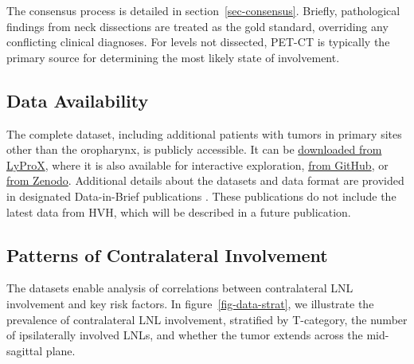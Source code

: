\documentclass[
  sn-mathphys-num,
]{sn-jnl}
\begin{document}
The consensus process is detailed in section~\ref{sec-consensus}.
Briefly, pathological findings from neck dissections are treated as the
gold standard, overriding any conflicting clinical diagnoses. For levels
not dissected, PET-CT is typically the primary source for determining
the most likely state of involvement.

\subsection{Data Availability}\label{data-availability}

The complete dataset, including additional patients with tumors in
primary sites other than the oropharynx, is publicly accessible. It can
be \href{https://lyprox.org/patients/dataset}{downloaded from LyProX},
where it is also available for interactive exploration,
\href{https://github.com/rmnldwg/lydata}{from GitHub}, or
\href{https://zenodo.org/search?q=lydata}{from Zenodo}. Additional
details about the datasets and data format are provided in designated
Data-in-Brief publications
\citep{ludwig_dataset_2022, ludwig_multicentric_2024}. These
publications do not include the latest data from HVH, which will be
described in a future publication.

\subsection{Patterns of Contralateral Involvement}\label{sec-data-strat}

The datasets enable analysis of correlations between contralateral LNL
involvement and key risk factors. In figure~\ref{fig-data-strat}, we
illustrate the prevalence of contralateral LNL involvement, stratified
by T-category, the number of ipsilaterally involved LNLs, and whether
the tumor extends across the mid-sagittal plane.
\end{document}
